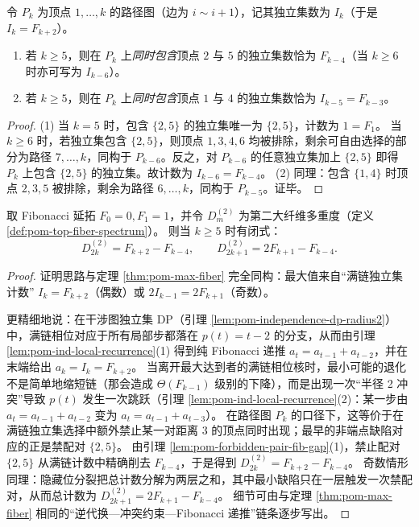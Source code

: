 \begin{lemma}\label{lem:pom-forbidden-pair-fib-gap}
令 \(P_k\) 为顶点 \(1,\dots,k\) 的路径图（边为 \(i\!\sim\! i{+}1\)），记其独立集数为 \(I_k\)（于是 \(I_k=F_{k+2}\)）。
\begin{enumerate}
  \item 若 \(k\ge 5\)，则在 \(P_k\) 上\emph{同时包含}顶点 \(2\) 与 \(5\) 的独立集数恰为 \(F_{k-4}\)（当 \(k\ge 6\) 时亦可写为 \(I_{k-6}\)）。
  \item 若 \(k\ge 5\)，则在 \(P_k\) 上\emph{同时包含}顶点 \(1\) 与 \(4\) 的独立集数恰为 \(I_{k-5}=F_{k-3}\)。
\end{enumerate}
\end{lemma}
\begin{proof}
(1) 当 \(k=5\) 时，包含 \(\{2,5\}\) 的独立集唯一为 \(\{2,5\}\)，计数为 \(1=F_1\)。
当 \(k\ge 6\) 时，若独立集包含 \(\{2,5\}\)，则顶点 \(1,3,4,6\) 均被排除，剩余可自由选择的部分为路径 \(7,\dots,k\)，同构于 \(P_{k-6}\)。反之，对 \(P_{k-6}\) 的任意独立集加上 \(\{2,5\}\) 即得 \(P_k\) 上包含 \(\{2,5\}\) 的独立集。故计数为 \(I_{k-6}=F_{k-4}\)。\;
(2) 同理：包含 \(\{1,4\}\) 时顶点 \(2,3,5\) 被排除，剩余为路径 \(6,\dots,k\)，同构于 \(P_{k-5}\)。证毕。
\end{proof}

\begin{theorem}[次大纤维闭式与显式间隙常数]\label{thm:pom-second-max-fiber-closed-form}
取 Fibonacci 延拓 \(F_0=0,F_1=1\)，并令 \(D_m^{(2)}\) 为第二大纤维多重度（定义 \ref{def:pom-top-fiber-spectrum}）。
则当 \(k\ge 5\) 时有闭式：
\[
D_{2k}^{(2)} = F_{k+2}-F_{k-4},
\qquad
D_{2k+1}^{(2)} = 2F_{k+1}-F_{k-4}.
\]
\end{theorem}
\begin{proof}
证明思路与定理 \ref{thm:pom-max-fiber} 完全同构：最大值来自“满链独立集计数” \(I_k=F_{k+2}\)（偶数）或 \(2I_{k-1}=2F_{k+1}\)（奇数）。
\par
更精细地说：在干涉图独立集 DP（引理 \ref{lem:pom-independence-dp-radius2}）中，满链相位对应于所有局部步都落在 \(p(t)=t-2\) 的分支，从而由引理 \ref{lem:pom-ind-local-recurrence}(1) 得到纯 Fibonacci 递推 \(a_t=a_{t-1}+a_{t-2}\)，并在末端给出 \(a_k=I_k=F_{k+2}\)。
当离开最大达到者的满链相位核时，最小可能的退化不是简单地缩短链（那会造成 \(\Theta(F_{k-1})\) 级别的下降），而是出现一次“半径 2 冲突”导致 \(p(t)\) 发生一次跳跃（引理 \ref{lem:pom-ind-local-recurrence}(2)：某一步由 \(a_t=a_{t-1}+a_{t-2}\) 变为 \(a_t=a_{t-1}+a_{t-3}\)）。
在路径图 \(P_k\) 的口径下，这等价于在满链独立集选择中额外禁止某一对距离 \(3\) 的顶点同时出现；最早的非端点缺陷对应的正是禁配对 \(\{2,5\}\)。
由引理 \ref{lem:pom-forbidden-pair-fib-gap}(1)，禁止配对 \(\{2,5\}\) 从满链计数中精确削去 \(F_{k-4}\)，于是得到
\(
D_{2k}^{(2)}=F_{k+2}-F_{k-4}
\)。
奇数情形同理：隐藏位分裂把总计数分解为两层之和，其中最小缺陷只在一层触发一次禁配对，从而总计数为
\(
D_{2k+1}^{(2)}=2F_{k+1}-F_{k-4}
\)。
细节可由与定理 \ref{thm:pom-max-fiber} 相同的“逆代换—冲突约束—Fibonacci 递推”链条逐步写出。
\end{proof}

